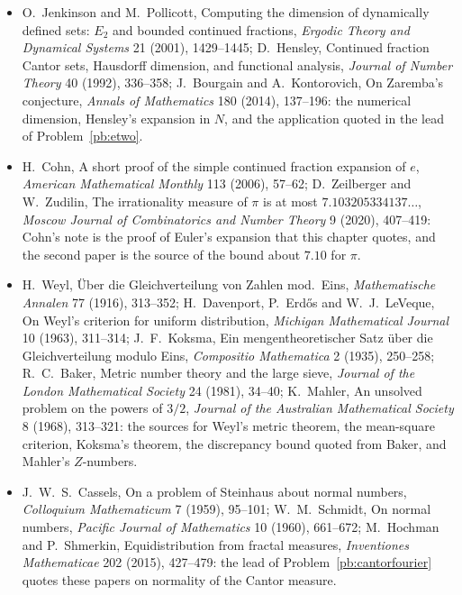 \begin{itemize}
H.~G.~Eggleston, The fractional dimension of a set defined by decimal properties, \emph{Quarterly Journal of Mathematics} 20 (1949), 31--36; P.~Billingsley, \emph{Ergodic
Theory and Information}, Wiley, 1965. Good's paper is the dimension $\frac12$ quoted in Problem~\ref{pb:good}, and Billingsley is the lemma in Problem~\ref{pb:eggleston}(a).
\item O.~Jenkinson and M.~Pollicott, Computing the dimension of dynamically defined sets: $E_2$ and bounded continued fractions, \emph{Ergodic Theory and Dynamical Systems} 21
(2001), 1429--1445; D.~Hensley, Continued fraction Cantor sets, Hausdorff dimension, and functional analysis, \emph{Journal of Number Theory} 40 (1992), 336--358;
J.~Bourgain and A.~Kontorovich, On Zaremba's conjecture, \emph{Annals of Mathematics} 180 (2014), 137--196: the numerical dimension, Hensley's expansion in $N$, and the application quoted in the lead of Problem~\ref{pb:etwo}.
\item H.~Cohn, A short proof of the simple continued fraction expansion of $e$, \emph{American Mathematical Monthly} 113 (2006), 57--62; D.~Zeilberger and W.~Zudilin, The
irrationality measure of $\pi$ is at most $7.103205334137\ldots$, \emph{Moscow Journal of Combinatorics and Number Theory} 9 (2020), 407--419: Cohn's note is the proof of Euler's expansion that this chapter quotes, and the second paper is the source of the bound about $7.10$ for $\pi$.
\item H.~Weyl, Über die Gleichverteilung von Zahlen mod.\ Eins, \emph{Mathematische Annalen} 77 (1916), 313--352; H.~Davenport, P.~Erdős and W.~J.~LeVeque, On Weyl's criterion
for uniform distribution, \emph{Michigan Mathematical Journal} 10 (1963), 311--314; J.~F.~Koksma, Ein mengentheoretischer Satz über die Gleichverteilung modulo Eins,
\emph{Compositio Mathematica} 2 (1935), 250--258; R.~C.~Baker, Metric number theory and the large sieve, \emph{Journal of the London Mathematical Society} 24 (1981), 34--40;
K.~Mahler, An unsolved problem on the powers of $3/2$, \emph{Journal of the Australian Mathematical Society} 8 (1968), 313--321: the sources for Weyl's metric theorem, the mean-square criterion, Koksma's theorem, the discrepancy bound quoted from Baker, and Mahler's $Z$-numbers.
\item J.~W.~S.~Cassels, On a problem of Steinhaus about normal numbers, \emph{Colloquium Mathematicum} 7 (1959), 95--101; W.~M.~Schmidt, On normal numbers, \emph{Pacific
Journal of Mathematics} 10 (1960), 661--672; M.~Hochman and P.~Shmerkin, Equidistribution from fractal measures, \emph{Inventiones Mathematicae} 202 (2015), 427--479: the lead of Problem~\ref{pb:cantorfourier} quotes these papers on normality of the Cantor measure.

\end{itemize}
